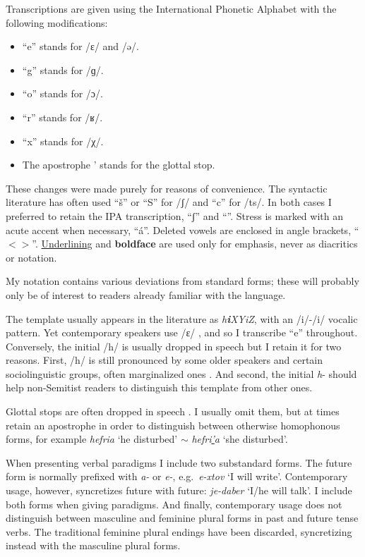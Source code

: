 Transcriptions are given using the International Phonetic Alphabet with the following modifications:
\begin{itemize}
	\item ``e'' stands for /ɛ/ and /ə/.
	\item ``g'' stands for /ɡ/.
	\item ``o'' stands for /ɔ/.
	\item ``r'' stands for /ʁ/.
	\item ``x'' stands for /χ/.
	\item The apostrophe ' stands for the glottal stop. %
\end{itemize}
These changes were made purely for reasons of convenience. The syntactic literature has often used ``\v{s}'' or ``S'' for /ʃ/ and ``c'' for /ts/. In both cases I preferred to retain the IPA transcription, ``ʃ'' and ``{\ts}''. Stress is marked with an acute accent when necessary, ``\'a''. Deleted vowels are enclosed in angle brackets, ``$<>$''. \underline{Underlining} and \textbf{boldface} are used only for emphasis, never as diacritics or notation.

My notation contains various deviations from standard forms; these will probably only be of interest to readers already familiar with the language.

The template {\thif} usually appears in the literature as \emph{h\textbf{i}XYiZ}, with an /i/-/i/ vocalic pattern. Yet contemporary speakers use /ɛ/ \citep{trachtman16}, and so I transcribe ``e'' throughout. Conversely, the initial /h/ is usually dropped in speech but I retain it for two reasons. First, /h/ is still pronounced by some older speakers and certain sociolinguistic groups, often marginalized ones \citep[cf.~][]{schwarzwald81biu,gafter14phd}. And second, the initial \emph{h}- should help non-Semitist readers to distinguish this template from other ones.

Glottal stops are often dropped in speech \citep{enguehardfaust18}. I usually omit them, but at times retain an apostrophe in order to distinguish between otherwise homophonous forms, for example \emph{hefria} `he disturbed' $\sim$ \emph{hefri\underline{'}a} `she disturbed'.

When presenting verbal paradigms I include two substandard forms. The  future form is normally prefixed with \emph{a-} or \emph{e-}, e.g.~\emph{e-xtov} `I will write'. Contemporary usage, however, syncretizes  future with  future: \emph{je-daber} `I/he will talk'. I include both forms when giving paradigms. And finally, contemporary usage does not distinguish between masculine and feminine plural forms in past and future tense verbs. The traditional feminine plural endings have been discarded, syncretizing instead with the masculine plural forms.

